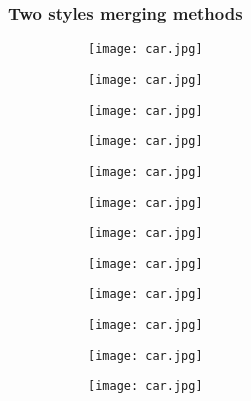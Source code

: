 \subsubsection{Two styles merging methods}
\begin{figure}[H]
	\centering
	\begin{subfigure}[b]{0.13\linewidth}
		\texttt{[image: car.jpg]} %
	\end{subfigure}
	\begin{subfigure}[b]{0.13\linewidth}
		\texttt{[image: car.jpg]} %
	\end{subfigure}
	\begin{subfigure}[b]{0.13\linewidth}
		\texttt{[image: car.jpg]} %
	\end{subfigure}
	\begin{subfigure}[b]{0.13\linewidth}
		\texttt{[image: car.jpg]} %
	\end{subfigure}
	\begin{subfigure}[b]{0.13\linewidth}
		\texttt{[image: car.jpg]} %
	\end{subfigure}
	\begin{subfigure}[b]{0.13\linewidth}
		\texttt{[image: car.jpg]} %
	\end{subfigure}
	\begin{subfigure}[b]{0.13\linewidth}
		\texttt{[image: car.jpg]} %
	\end{subfigure}
	\centering
	\begin{subfigure}[b]{0.13\linewidth}
		\texttt{[image: car.jpg]} %
	\end{subfigure}
	\begin{subfigure}[b]{0.13\linewidth}
		\texttt{[image: car.jpg]} %
	\end{subfigure}
	\begin{subfigure}[b]{0.13\linewidth}
		\texttt{[image: car.jpg]} %
	\end{subfigure}
	\begin{subfigure}[b]{0.13\linewidth}
		\texttt{[image: car.jpg]} %
	\end{subfigure}
	\begin{subfigure}[b]{0.13\linewidth}
		\texttt{[image: car.jpg]} %

\end{subfigure}
\end{figure}
